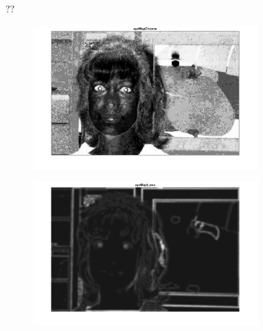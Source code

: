 \begin{figure}[H]
\begin{subfigure}{.24\textwidth}
  \caption{}
\end{subfigure}

\caption{??}
\label{fig:faceMasks}
\end{figure}



\begin{figure}[H]
\centering

\begin{subfigure}{.33\textwidth}
  \centering
  \includegraphics[width=0.95\textwidth]{img/fd2/EyeMapChroma.png}
  \caption{}
\end{subfigure}%
\begin{subfigure}{.33\textwidth}
  \centering
  \includegraphics[width=0.95\textwidth]{img/fd2/EyeMapLuma.png}
  \caption{}
\end{subfigure}%
\begin{subfigure}{.33\textwidth}
  \centering

\end{subfigure}
\end{figure}

